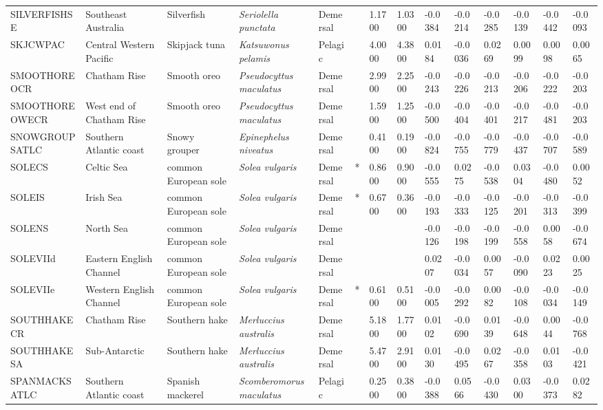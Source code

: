 \begin{longtable}{p{2.8cm}p{2cm}p{1.7cm}p{1.7cm}p{1cm}p{0.3cm}p{1cm}p{1cm}p{1cm}p{1cm}p{1cm}p{1cm}p{1cm}p{1cm}}
  SILVERFISHSE & Southeast Australia & Silverfish & \textit{Seriolella punctata} & Demersal &   & 1.1700 & 1.0300 & -0.0384 & -0.0214 & -0.0285 & -0.0139 & -0.0442 & -0.0093 \\ 
  SKJCWPAC & Central Western Pacific & Skipjack tuna & \textit{Katsuwonus pelamis} & Pelagic &   & 4.0000 & 4.3800 & 0.0184 & -0.0036 & 0.0269 & 0.0099 & 0.0098 & 0.0065 \\ 
  SMOOTHOREOCR & Chatham Rise & Smooth oreo & \textit{Pseudocyttus maculatus} & Demersal &   & 2.9900 & 2.2500 & -0.0243 & -0.0226 & -0.0213 & -0.0206 & -0.0222 & -0.0203 \\ 
  SMOOTHOREOWECR & West end of Chatham Rise & Smooth oreo & \textit{Pseudocyttus maculatus} & Demersal &   & 1.5900 & 1.2500 & -0.0500 & -0.0404 & -0.0401 & -0.0217 & -0.0481 & -0.0203 \\ 
  SNOWGROUPSATLC & Southern Atlantic coast & Snowy grouper & \textit{Epinephelus niveatus} & Demersal &   & 0.4100 & 0.1900 & -0.0824 & -0.0755 & -0.0779 & -0.0437 & -0.0707 & -0.0589 \\ 
  SOLECS & Celtic Sea & common European sole & \textit{Solea vulgaris} & Demersal & * & 0.8600 & 0.9000 & -0.0555 & 0.0275 & -0.0538 & 0.0304 & -0.0480 & 0.0052 \\ 
  SOLEIS & Irish Sea & common European sole & \textit{Solea vulgaris} & Demersal & * & 0.6700 & 0.3600 & -0.0193 & -0.0333 & -0.0125 & -0.0201 & -0.0313 & -0.0399 \\ 
  SOLENS & North Sea & common European sole & \textit{Solea vulgaris} & Demersal &  &  &  & -0.0126 & -0.0198 & -0.0199 & -0.0558 & 0.0058 & -0.0674 \\ 
  SOLEVIId & Eastern English Channel & common European sole & \textit{Solea vulgaris} & Demersal &  &  &  & 0.0207 & -0.0034 & 0.0057 & -0.0090 & 0.0223 & 0.0025 \\ 
  SOLEVIIe & Western English Channel & common European sole & \textit{Solea vulgaris} & Demersal & * & 0.6100 & 0.5100 & -0.0005 & -0.0292 & 0.0082 & -0.0108 & -0.0034 & -0.0149 \\ 
  SOUTHHAKECR & Chatham Rise & Southern hake & \textit{Merluccius australis} & Demersal &   & 5.1800 & 1.7700 & 0.0102 & -0.0690 & 0.0139 & -0.0648 & 0.0044 & -0.0768 \\ 
  SOUTHHAKESA & Sub-Antarctic & Southern hake & \textit{Merluccius australis} & Demersal &   & 5.4700 & 2.9100 & 0.0130 & -0.0495 & 0.0267 & -0.0358 & 0.0103 & -0.0421 \\ 
  SPANMACKSATLC & Southern Atlantic coast & Spanish mackerel & \textit{Scomberomorus maculatus} & Pelagic &   & 0.2500 & 0.3800 & -0.0388 & 0.0566 & -0.0430 & 0.0300 & -0.0373 & 0.0282 \\ 

\end{longtable}

